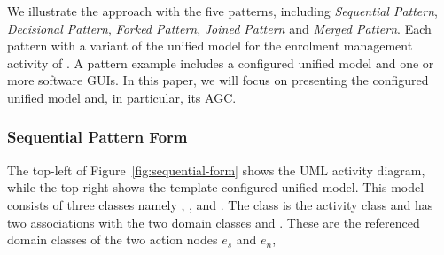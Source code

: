 We illustrate the approach with the five patterns, including
 \textit{Sequential Pattern},
 \textit{Decisional Pattern},  \textit{Forked Pattern}, \textit{Joined Pattern} and \textit{Merged Pattern}.
Each pattern with a variant of the unified model for the enrolment management activity of \courseman. A pattern example includes a configured unified model and one or more software GUIs. In this paper, we will focus on presenting the configured unified model and, in particular, its AGC. 


\subsubsection{Sequential Pattern Form} \label{sect:sequential-pattern}

The top-left of Figure~\ref{fig:sequential-form} shows the UML activity diagram, while the top-right shows the template configured unified model.
This model consists of three classes namely , , and . The class  is the activity class and has two associations with the two domain classes  and . These are the referenced domain classes of the two action nodes $ e_s $ and $ e_n $, \resp

